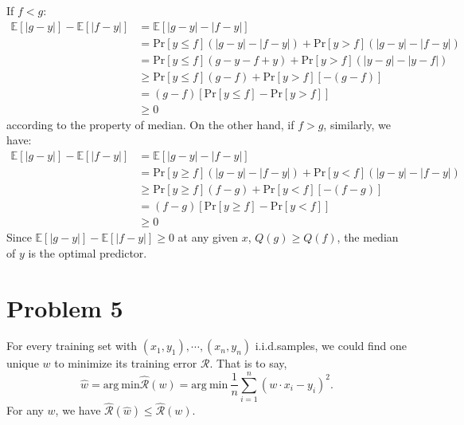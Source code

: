 \documentclass[twoside,11pt]{homework}
\begin{document}
If $f < g$:
%
\begin{equation}
\begin{split}
\mathbb{E}[|g-y|] - \mathbb{E}[|f-y|] &=  \mathbb{E}[|g-y| - |f-y|] \\
&= \mathrm{Pr}[y \le f] (|g-y| - |f-y|) + \mathrm{Pr}[y > f] (|g-y| - |f-y|) \\
&= \mathrm{Pr}[y \le f] (g - y - f + y) + \mathrm{Pr}[y > f] (|y-g| - |y-f|) \\
&\ge \mathrm{Pr}[y \le f] (g - f) + \mathrm{Pr}[y > f] [-(g-f)] \\
&= (g-f) [\mathrm{Pr}[y \le f]  -  \mathrm{Pr}[y > f]] \\
&\ge 0
\end{split}
\end{equation}
%
according to the property of median. 
On the other hand, if $f > g$, similarly, we have:
%
\begin{equation}
\begin{split}
\mathbb{E}[|g-y|] - \mathbb{E}[|f-y|] &=  \mathbb{E}[|g-y| - |f-y|] \\
&= \mathrm{Pr}[y \ge f] (|g-y| - |f-y|) + \mathrm{Pr}[y < f] (|g-y| - |f-y|)  \\
&\ge \mathrm{Pr}[y \ge f] (f-g) + \mathrm{Pr}[y < f] [-(f-g)] \\
&= (f-g) [\mathrm{Pr}[y \ge f]  -  \mathrm{Pr}[y < f]] \\
&\ge 0
\end{split}
\end{equation}
%
Since $\mathbb{E}[|g-y|] - \mathbb{E}[|f-y|] \ge 0$ at any given $x$, $Q(g) \ge Q(f)$, the median of $y$ is the optimal predictor.
 
 
\section*{Problem 5}
For every training set with $(x_1, y_1), \cdots, (x_n, y_n)$ i.i.d.samples, we could find one unique $w$ to minimize its training error $\mathcal{R}$.
That is to say,
\begin{equation}
   \hat{w} = \mathrm{arg\ min} \hat{\mathcal{R}}(w) = \mathrm{arg\ min}\ \frac{1}{n} \sum_{i=1}^n (w \cdot x_i - y_i)^2. 
\end{equation}
For any $w$, we have $\hat{\mathcal{R}}(\hat{w}) \le \hat{\mathcal{R}}(w) $.%
\end{document}
